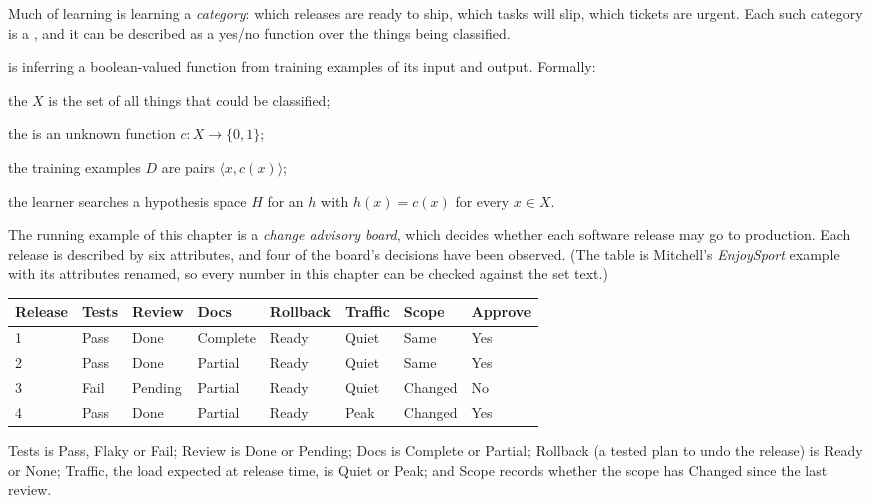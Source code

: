 Much of learning is learning a \emph{category}: which releases are ready to ship,
which tasks will slip, which tickets are urgent. Each such category is a
, and it can be described as a yes/no function over the things
being classified.

\begin{definitionbox}
 is inferring a boolean-valued function from training
examples of its input and output. Formally:
\begin{tight}
  \item the  $X$ is the set of all things that could be
        classified;
  \item the  is an unknown function $c: X \to \{0, 1\}$;
  \item the training examples $D$ are pairs $\langle x, c(x)\rangle$;
  \item the learner searches a hypothesis space $H$ for an $h$ with $h(x) = c(x)$
        for every $x \in X$.
\end{tight}
\end{definitionbox}

The running example of this chapter is a \emph{change advisory board}, which
decides whether each software release may go to production. Each release is
described by six attributes, and four of the board's decisions have been
observed. (The table is Mitchell's \emph{EnjoySport} example with its attributes
renamed, so every number in this chapter can be checked against the set text.)

\begin{longtable}{@{}L{1.4cm}L{1.3cm}L{1.6cm}L{1.9cm}L{1.8cm}L{1.6cm}L{1.6cm}L{1.9cm}@{}}
\toprule
{}
\textbf{Release} & \textbf{Tests} & \textbf{Review} & \textbf{Docs} & \textbf{Rollback} &
\textbf{Traffic} & \textbf{Scope} & \textbf{Approve} \\
\midrule
{} & Pass & Done & Complete & Ready & Quiet & Same & Yes \\
2 & Pass & Done & Partial & Ready & Quiet & Same & Yes \\
3 & Fail & Pending & Partial & Ready & Quiet & Changed & No \\
4 & Pass & Done & Partial & Ready & Peak & Changed & Yes \\
\bottomrule
\end{longtable}

\noindent Tests is Pass, Flaky or Fail; Review is Done or Pending; Docs is
Complete or Partial; Rollback (a tested plan to undo the release) is Ready or
None; Traffic, the load expected at release time, is Quiet or Peak; and Scope
records whether the scope has Changed since the last review.

